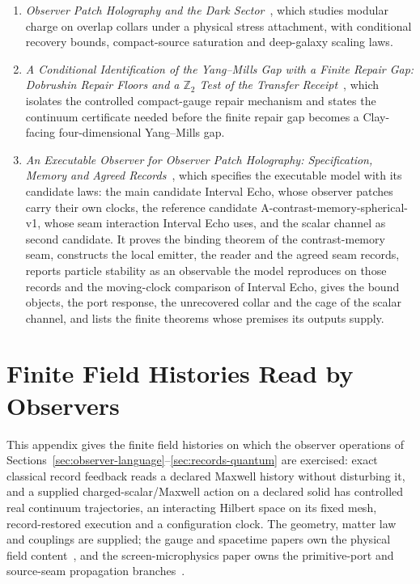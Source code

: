 \documentclass[11pt]{article}
\begin{document}
\begin{enumerate}[leftmargin=2em]
\item \emph{Observer Patch Holography and the Dark Sector}~\cite{ophdarkmatter}, which studies modular charge on overlap collars under a physical stress attachment, with conditional recovery bounds, compact-source saturation and deep-galaxy scaling laws.
\item \emph{A Conditional Identification of the Yang--Mills Gap with a Finite Repair Gap: Dobrushin Repair Floors and a \(\mathbb Z_2\) Test of the Transfer Receipt}~\cite{ophyangmills}, which isolates the controlled compact-gauge repair mechanism and states the continuum certificate needed before the finite repair gap becomes a Clay-facing four-dimensional Yang--Mills gap.
\item \emph{An Executable Observer for Observer Patch Holography: Specification, Memory and Agreed Records}~\cite{ophmodel}, which specifies the executable model with its candidate laws: the main candidate Interval Echo, whose observer patches carry their own clocks, the reference candidate A-contrast-memory-spherical-v1, whose seam interaction Interval Echo uses, and the scalar channel as second candidate. It proves the binding theorem of the contrast-memory seam, constructs the local emitter, the reader and the agreed seam records, reports particle stability as an observable the model reproduces on those records and the moving-clock comparison of Interval Echo, gives the bound objects, the port response, the unrecovered collar and the cage of the scalar channel, and lists the finite theorems whose premises its outputs supply.
\end{enumerate}

\def\OPHSkipEmbeddedReferences{1}


\appendix
\section{Finite Field Histories Read by Observers}
\label{app:field-histories}

This appendix gives the finite field histories on which the observer
operations of Sections~\ref{sec:observer-language}--\ref{sec:records-quantum}
are exercised: exact classical record feedback reads a declared Maxwell
history without disturbing it, and a supplied charged-scalar/Maxwell action
on a declared solid has controlled real continuum trajectories, an
interacting Hilbert space on its fixed mesh, record-restored execution and a
configuration clock. The geometry, matter law and couplings are supplied; the
gauge and spacetime papers own the physical field
content~\cite{ophGauge,ophEinstein}, and the screen-microphysics paper owns the
primitive-port and source-seam propagation branches~\cite{ophmicrophysics}.
\end{document}
